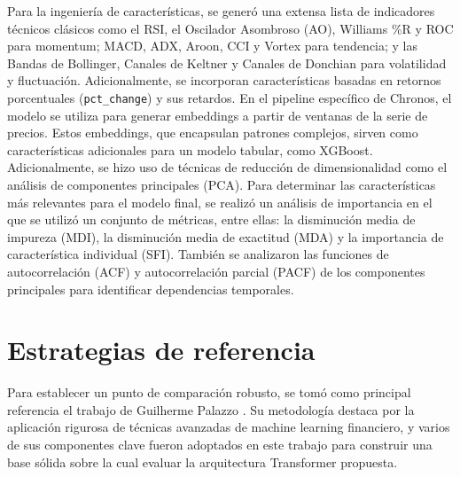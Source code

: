 Para la ingeniería de características, se generó una extensa lista de indicadores técnicos clásicos como el RSI, el Oscilador Asombroso (AO), Williams \%R y ROC para momentum; MACD, ADX, Aroon, CCI y Vortex para tendencia; y las Bandas de Bollinger, Canales de Keltner y Canales de Donchian para volatilidad y fluctuación. Adicionalmente, se incorporan características basadas en retornos porcentuales (\texttt{pct\_change}) y sus retardos. En el pipeline específico de Chronos, el modelo se utiliza para generar embeddings a partir de ventanas de la serie de precios. Estos embeddings, que encapsulan patrones complejos, sirven como características adicionales para un modelo tabular, como XGBoost. Adicionalmente, se hizo uso de técnicas de reducción de dimensionalidad como el análisis de componentes principales (PCA). Para determinar las características más relevantes para el modelo final, se realizó un análisis de importancia en el que se utilizó un conjunto de métricas, entre ellas: la disminución media de impureza (MDI), la disminución media de exactitud (MDA) y la importancia de característica individual (SFI). También se analizaron las funciones de autocorrelación (ACF) y autocorrelación parcial (PACF) de los componentes principales para identificar dependencias temporales.

\section{Estrategias de referencia}

Para establecer un punto de comparación robusto, se tomó como principal referencia el trabajo de Guilherme Palazzo \cite{Palazzo:2023}. Su metodología destaca por la aplicación rigurosa de técnicas avanzadas de machine learning financiero, y varios de sus componentes clave fueron adoptados en este trabajo para construir una base sólida sobre la cual evaluar la arquitectura Transformer propuesta.

